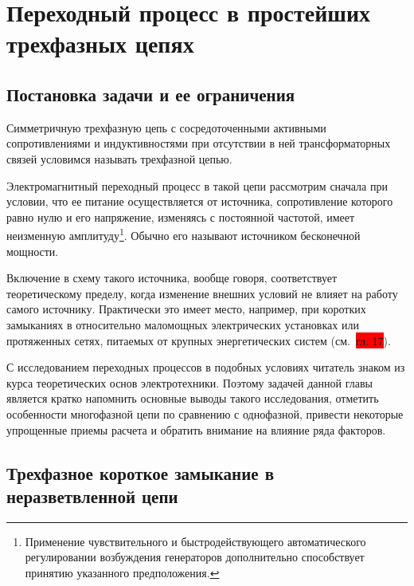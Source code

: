 \chapter{Переходный процесс в простейших трехфазных цепях}
\label{chap:3 perehodnyi_protcess_v_prosteishikh_trekhfaznykh_tcepiakh}

\section{Постановка задачи и ее ограничения}
\label{sec:3-1 postanovka_zadachi_i_ee_ogranicheniia}

Симметричную трехфазную цепь с сосредоточенными активными сопротивлениями и индуктивностями при отсутствии в ней трансформаторных связей условимся называть  трехфазной цепью.

Электромагнитный переходный процесс в такой цепи рассмотрим сначала при условии, что ее питание осуществляется от источника, сопротивление которого равно нулю и его напряжение, изменяясь с постоянной частотой, имеет неизменную амплитуду\footnote{Применение чувствительного и быстродействующего автоматического регулировании возбуждения генераторов дополнительно способствует принятию указанного предположения.}. Обычно его называют источником бесконечной  мощности.

Включение в схему такого источника, вообще говоря, соответствует теоретическому пределу, когда изменение внешних условий не влияет на работу самого источнику. Практически это имеет место, например, при коротких замыканиях в относительно маломощных электрических установках или протяженных сетях, питаемых от крупных энергетических систем (см.~\colorbox{red}{гл. 17}).

С исследованием переходных процессов в подобных условиях читатель знаком из курса теоретических основ электротехники. Поэтому задачей данной главы является кратко напомнить основные выводы такого исследования, отметить особенности многофазной цепи по сравнению с однофазной, привести некоторые упрощенные приемы расчета и обратить внимание на влияние ряда факторов.

\section{Трехфазное короткое замыкание в неразветвленной цепи}
\label{sec:3-2 trekhfaznoe_korotkoe_zamykanie_v_nerazvetvlennoi_tcepi}

